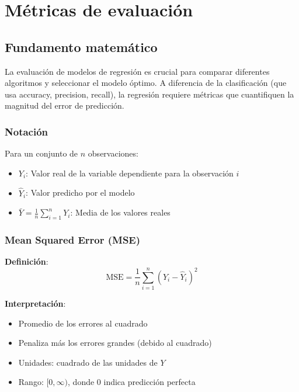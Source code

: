 \documentclass[
  doc,
  floatsintext,
  longtable,
  a4paper,
  nolmodern,
  notxfonts,
  notimes,
  12pt,
  colorlinks=true,linkcolor=blue,citecolor=blue,urlcolor=blue]{apa7}
\providecommand{\tightlist}{%
  \setlength{\itemsep}{0pt}\setlength{\parskip}{0pt}}
\begin{document}
\section{Métricas de evaluación}\label{muxe9tricas-de-evaluaciuxf3n}

\subsection{Fundamento matemático}\label{fundamento-matemuxe1tico-6}

La evaluación de modelos de regresión es crucial para comparar
diferentes algoritmos y seleccionar el modelo óptimo. A diferencia de la
clasificación (que usa accuracy, precision, recall), la regresión
requiere métricas que cuantifiquen la magnitud del error de predicción.

\subsubsection{Notación}\label{notaciuxf3n}

Para un conjunto de \(n\) observaciones:

\begin{itemize}
\tightlist
\item
  \(Y_i\): Valor real de la variable dependiente para la observación
  \(i\)
\item
  \(\hat{Y}_i\): Valor predicho por el modelo
\item
  \(\bar{Y} = \frac{1}{n}\sum_{i=1}^{n} Y_i\): Media de los valores
  reales
\end{itemize}

\subsubsection{Mean Squared Error (MSE)}\label{mean-squared-error-mse}

\textbf{Definición}: \[
\text{MSE} = \frac{1}{n} \sum_{i=1}^{n} (Y_i - \hat{Y}_i)^2
\]

\textbf{Interpretación}:

\begin{itemize}
\tightlist
\item
  Promedio de los errores al cuadrado
\item
  Penaliza más los errores grandes (debido al cuadrado)
\item
  Unidades: cuadrado de las unidades de \(Y\)
\item
  Rango: \([0, \infty)\), donde 0 indica predicción perfecta
\end{itemize}
\end{document}

